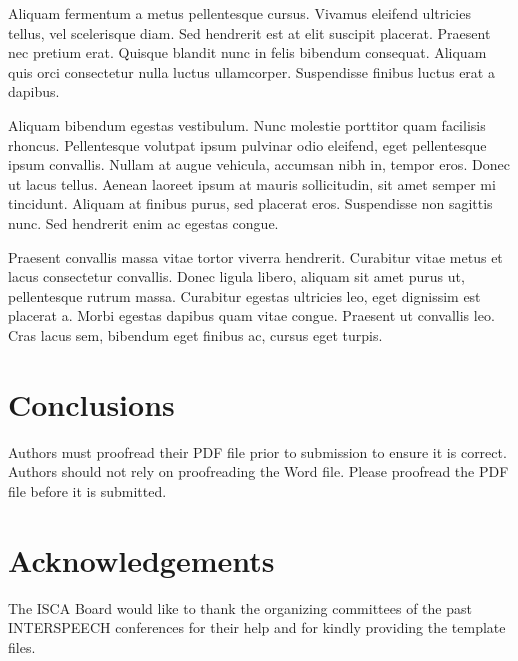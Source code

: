 \documentclass[a4paper]{article}
\begin{document}
Aliquam fermentum a metus pellentesque cursus. Vivamus eleifend ultricies tellus, vel scelerisque diam. Sed hendrerit est at elit suscipit placerat. Praesent nec pretium erat. Quisque blandit nunc in felis bibendum consequat. Aliquam quis orci consectetur nulla luctus ullamcorper. Suspendisse finibus luctus erat a dapibus.

Aliquam bibendum egestas vestibulum. Nunc molestie porttitor quam facilisis rhoncus. Pellentesque volutpat ipsum pulvinar odio eleifend, eget pellentesque ipsum convallis. Nullam at augue vehicula, accumsan nibh in, tempor eros. Donec ut lacus tellus. Aenean laoreet ipsum at mauris sollicitudin, sit amet semper mi tincidunt. Aliquam at finibus purus, sed placerat eros. Suspendisse non sagittis nunc. Sed hendrerit enim ac egestas congue.

Praesent convallis massa vitae tortor viverra hendrerit. Curabitur vitae metus et lacus consectetur convallis. Donec ligula libero, aliquam sit amet purus ut, pellentesque rutrum massa. Curabitur egestas ultricies leo, eget dignissim est placerat a. Morbi egestas dapibus quam vitae congue. Praesent ut convallis leo. Cras lacus sem, bibendum eget finibus ac, cursus eget turpis.

\section{Conclusions}

Authors must proofread their PDF file prior to submission to ensure it is correct. Authors should not rely on proofreading the Word file. Please proofread the PDF file before it is submitted.

\section{Acknowledgements}

The ISCA Board would like to thank the organizing committees of the past INTERSPEECH conferences for their help and for kindly providing the template files.





\end{document}
